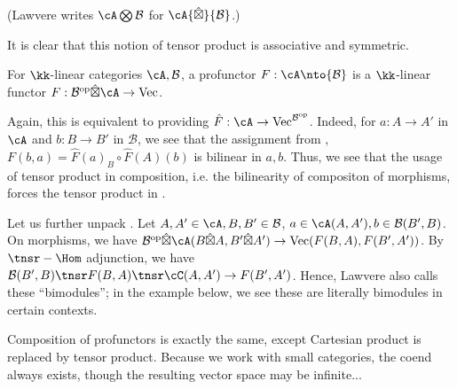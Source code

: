 \documentclass[12pt]{article}
\newcommand{\op}{{\text{op}}}
\newcommand{\cB}{{\mathcal{B}}}
\newcommand{\hatbox}{{\hat{\boxtimes}}}
\DeclareMathOperator{\Vect}{Vec}
\begin{document}
(Lawvere \cite{Lawvere} writes $\cA \bigotimes \cB$
for $\cA \hatbox \cB$.)

It is clear that
this notion of tensor product is associative and symmetric.

\begin{definition}
\label{d:profunctor-vec}
For $\kk$-linear categories $\cA,\cB$,
a profunctor $F: \cA \nto \cB$ is a $\kk$-linear functor
$F: \cB^\op \hatbox \cA \to \Vect$.
\end{definition}

\begin{remark}
\label{r:profunctor-alt-vec}
Again, this is equivalent to providing
$\hat{F}: \cA \to \Vect^{\cB^\op}$.
Indeed, for $a: A \to A'$ in $\cA$ and
$b: B \to B'$ in $\cB$,
we see that the assignment from ,
$F(b,a) = \hat{F}(a)_B \circ \hat{F}(A)(b)$
is bilinear in $a,b$.
Thus, we see that the usage of tensor product
in composition, i.e. the bilinearity of compositon of morphisms,
forces the tensor product in .
\end{remark}

Let us further unpack .
Let $A,A' \in \cA, B,B' \in \cB$,
$a \in \cA(A,A'), b \in \cB(B',B)$.
On morphisms, we have
$\cB^\op \hatbox \cA (B \hatbox A, B' \hatbox A')
\to \Vect(F(B,A), F(B',A'))$.
By $\tnsr-\Hom$ adjunction, we have
$\cB(B',B) \tnsr F(B,A) \tnsr \cC(A,A') \to F(B',A')$.
Hence, Lawvere \cite{Lawvere} also calls these ``bimodules'';
in the example below, we see these are literally bimodules
in certain contexts.


Composition of profunctors is exactly the same,
except Cartesian product is replaced by tensor product.
Because we work with small categories,
the coend always exists, though the resulting vector space
may be infinite...
\end{document}
